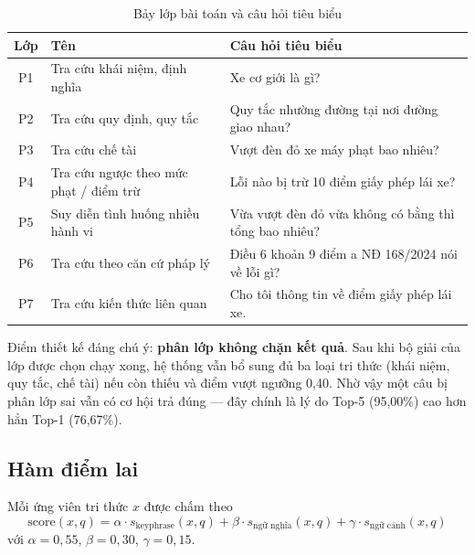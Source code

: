 \begin{table}[H]
\centering
\caption{Bảy lớp bài toán và câu hỏi tiêu biểu}
\label{tab:lop}
\renewcommand{\arraystretch}{1.2}
\begin{tabularx}{\textwidth}{@{}c >{\raggedright\arraybackslash}p{5.6cm} L@{}}
\toprule
\textbf{Lớp} & \textbf{Tên} & \textbf{Câu hỏi tiêu biểu} \\
\midrule
P1 & Tra cứu khái niệm, định nghĩa           & Xe cơ giới là gì? \\
P2 & Tra cứu quy định, quy tắc               & Quy tắc nhường đường tại nơi đường giao nhau? \\
P3 & Tra cứu chế tài                         & Vượt đèn đỏ xe máy phạt bao nhiêu? \\
P4 & Tra cứu ngược theo mức phạt / điểm trừ  & Lỗi nào bị trừ 10 điểm giấy phép lái xe? \\
P5 & Suy diễn tình huống nhiều hành vi       & Vừa vượt đèn đỏ vừa không có bằng thì tổng bao nhiêu? \\
P6 & Tra cứu theo căn cứ pháp lý             & Điều 6 khoản 9 điểm a NĐ 168/2024 nói về lỗi gì? \\
P7 & Tra cứu kiến thức liên quan             & Cho tôi thông tin về điểm giấy phép lái xe. \\
\bottomrule
\end{tabularx}
\end{table}

Điểm thiết kế đáng chú ý: \textbf{phân lớp không chặn kết quả}. Sau khi bộ giải của lớp được
chọn chạy xong, hệ thống vẫn bổ sung đủ ba loại tri thức (khái niệm, quy tắc, chế tài) nếu
còn thiếu và điểm vượt ngưỡng 0,40. Nhờ vậy một câu bị phân lớp sai vẫn có cơ hội trả đúng
--- đây chính là lý do Top-5 (95,00\%) cao hơn hẳn Top-1 (76,67\%).

\subsection{Hàm điểm lai}

Mỗi ứng viên tri thức $x$ được chấm theo
\begin{equation}
  \mathrm{score}(x, q) = \alpha \cdot s_{\text{keyphrase}}(x,q)
                       + \beta  \cdot s_{\text{ngữ nghĩa}}(x,q)
                       + \gamma \cdot s_{\text{ngữ cảnh}}(x,q)
  \label{eq:score}
\end{equation}
với $\alpha = 0{,}55$, $\beta = 0{,}30$, $\gamma = 0{,}15$.

